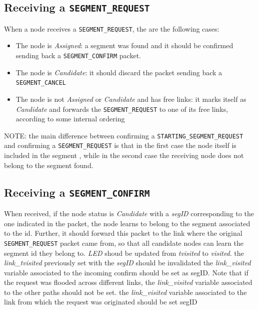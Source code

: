 \subsection{Receiving a \texttt{SEGMENT\_REQUEST}}
When a node receives a \texttt{SEGMENT\_REQUEST}, the are the following cases:

\begin{itemize}
\item The node is \emph{Assigned}: a segment was
found and it should be confirmed sending back a \texttt{SEGMENT\_CONFIRM}
packet.  
\item The node is \emph{Candidate}: it should discard the packet sending
back a \texttt{SEGMENT\_CANCEL} 
\item The node is not \emph{Assigned} or \emph{Candidate} and has free
links: it marks itself as \emph{Candidate} and forwards the \texttt{SEGMENT\_REQUEST}
to one of its free links, according to some internal ordering
\end{itemize}

NOTE: the main difference between confirming a \texttt{STARTING\_SEGMENT\_REQUEST}
and confirming a \texttt{SEGMENT\_REQUEST} is that in the first case the node
itself is included in the segment , while in the second case the
receiving node does not belong to the segment found. 


\subsection{Receiving a \texttt{SEGMENT\_CONFIRM}}
When received, if the node status is \emph{Candidate} with a \emph{segID} corresponding to the one indicated in
the packet, the node learns to belong to the segment associated to the
id. Further, it should forward this packet to the link where the
original \texttt{SEGMENT\_REQUEST} packet came from, so that all candidate nodes
can learn the segment id they belong to.  \emph{LED} shoud be
updated from \emph{tvisited} to \emph{visited}.  the
\emph{link\_tvisited} previously set with the \emph{segID} should be invalidated the
\emph{link\_visited} variable associated to the incoming confirm should be set
as segID. Note that if the request was flooded across different links,
the \emph{link\_visited} variable associated to the other paths should not be
set.  the \emph{link\_visited} variable associated to the link from which the
request was originated should be set segID

